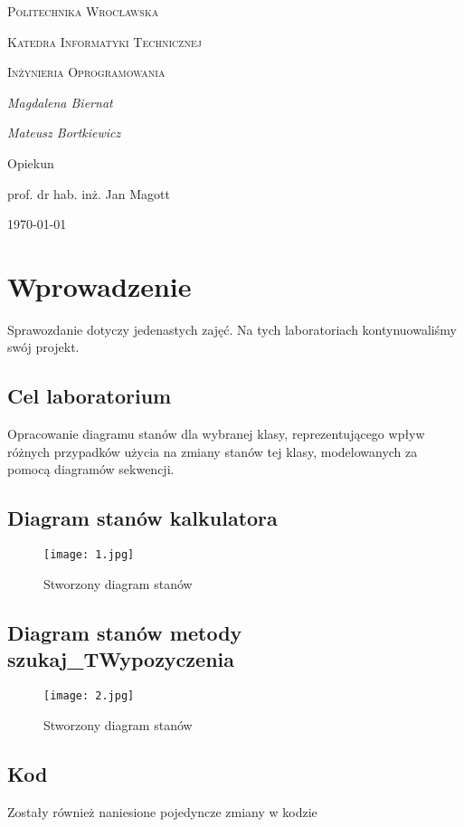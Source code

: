 \documentclass{article}
\begin{document}
	
	\begin{titlepage}
		\centering
		{\scshape\LARGE Politechnika Wrocławska \par}
		{\scshape\Large Katedra Informatyki Technicznej\par}
		
		\vspace{1cm}
		{\scshape\Large Inżynieria Oprogramowania\par}
		\vspace{1.5cm}
		{\huge\bfseries \par}
		\vspace{2cm}
		{\Large\itshape Magdalena Biernat\par}
		{\Large\itshape Mateusz Bortkiewicz\par}
		\vfill
		Opiekun\par
		prof. dr hab. inż. Jan Magott 
		
		\vfill
		{\large \today\par}
	\end{titlepage}
	\newpage
	\section{Wprowadzenie}
	Sprawozdanie dotyczy jedenastych zajęć. Na tych laboratoriach kontynuowaliśmy swój projekt. 
	
	\subsection{Cel laboratorium}
	Opracowanie diagramu stanów dla wybranej klasy, reprezentującego wpływ różnych przypadków użycia na	zmiany stanów tej klasy, modelowanych za pomocą	diagramów sekwencji.
	\subsection{Diagram stanów kalkulatora}
	\begin{figure}[!ht]
		\centering
		\texttt{[image: 1.jpg]}
		\caption{Stworzony diagram stanów}
		\label{fig:obrazek 1}
		\newpage
	\end{figure}
	\subsection{Diagram stanów metody szukaj\_TWypozyczenia}
	\begin{figure}[!ht]
		\centering
		\texttt{[image: 2.jpg]}
		\caption{Stworzony diagram stanów}
		\label{fig:obrazek 2}
		\newpage
	\end{figure}
\subsection{Kod}
Zostały również naniesione pojedyncze zmiany w kodzie
\end{document}

